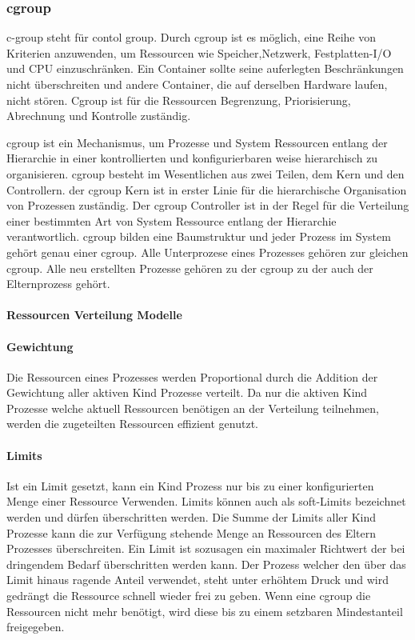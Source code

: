 \documentclass[12pt,a4paper,bibliography=totocnumbered,listof=totocnumbered]{scrartcl}
\begin{document}
\subsubsection{cgroup}
\glqq c-group\grqq{} steht für \glqq contol group\grqq{}. Durch cgroup ist es möglich, eine Reihe von Kriterien anzuwenden, um Ressourcen wie Speicher,Netzwerk, Festplatten-I/O und CPU einzuschränken. Ein Container sollte seine auferlegten Beschränkungen nicht überschreiten und andere Container, die auf derselben Hardware laufen, nicht stören. Cgroup ist für die Ressourcen Begrenzung, Priorisierung, Abrechnung und Kontrolle zuständig.\cite{Heo2015ControlV2} 

cgroup ist ein Mechanismus, um Prozesse und System Ressourcen entlang der Hierarchie in einer kontrollierten und konfigurierbaren weise hierarchisch zu organisieren. cgroup besteht im Wesentlichen aus zwei Teilen, dem Kern und den Controllern. der cgroup Kern ist in erster Linie für die hierarchische Organisation von Prozessen zuständig. Der cgroup Controller ist in der Regel für die Verteilung einer bestimmten Art von System Ressource entlang der Hierarchie verantwortlich. cgroup bilden eine Baumstruktur und jeder Prozess im System gehört genau einer cgroup. Alle Unterprozese eines Prozesses gehören zur gleichen cgroup. Alle neu erstellten Prozesse gehören zu der cgroup zu der auch der Elternprozess gehört.


\paragraph{Ressourcen Verteilung Modelle}

\paragraph{Gewichtung}
Die Ressourcen eines Prozesses werden Proportional durch die Addition der Gewichtung aller aktiven Kind Prozesse verteilt. Da nur die aktiven Kind Prozesse welche aktuell Ressourcen benötigen an der Verteilung teilnehmen, werden die zugeteilten Ressourcen effizient genutzt.

\paragraph{Limits}
Ist ein Limit gesetzt, kann ein Kind Prozess nur bis zu einer konfigurierten Menge einer Ressource Verwenden. Limits können auch als soft-Limits bezeichnet werden und dürfen überschritten werden. Die Summe der Limits aller Kind Prozesse kann die zur Verfügung stehende Menge an Ressourcen des Eltern Prozesses überschreiten. Ein Limit ist sozusagen ein maximaler Richtwert der bei dringendem Bedarf überschritten werden kann. Der Prozess welcher den über das Limit hinaus ragende Anteil verwendet, steht unter erhöhtem Druck und wird gedrängt die Ressource schnell wieder frei zu geben. Wenn eine cgroup die Ressourcen nicht mehr benötigt, wird diese bis zu einem setzbaren Mindestanteil freigegeben.
\end{document}
